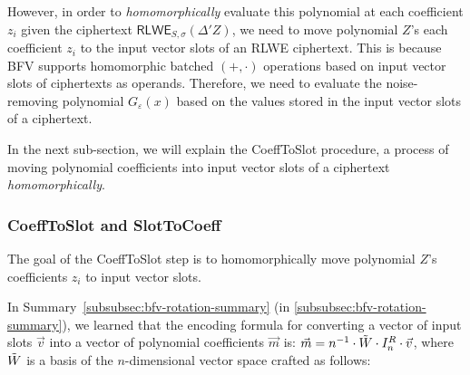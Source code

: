 




However, in order to \textit{homomorphically} evaluate this polynomial at each coefficient $z_i$ given the ciphertext $\textsf{RLWE}_{S, \sigma}(\Delta' Z)$, we need to move polynomial $Z$'s each coefficient $z_i$ to the input vector slots of an RLWE ciphertext. This is because BFV supports homomorphic batched $(+, \cdot)$ operations based on input vector slots of ciphertexts as operands. Therefore, we need to evaluate the noise-removing polynomial $G_\varepsilon(x)$ based on the values stored in the input vector slots of a ciphertext. 

In the next sub-section, we will explain the \textsf{CoeffToSlot} procedure, a process of moving polynomial coefficients into input vector slots of a ciphertext \textit{homomorphically}. 

\subsubsection{\textsf{CoeffToSlot} and \textsf{SlotToCoeff}}
\label{subsubsec:bfv-bootstrapping-coefftoslot}

The goal of the \textsf{CoeffToSlot} step is to homomorphically move polynomial $Z$'s coefficients $z_i$ to input vector slots. 


In Summary~\ref*{subsubsec:bfv-rotation-summary} (in \autoref{subsubsec:bfv-rotation-summary}), we learned that the encoding formula for converting a vector of input slots $\vec{v}$ into a vector of polynomial coefficients $\vec{m}$ is: $\vec{m} = n^{-1}\cdot\tilde{W} \cdot I_n^R \cdot \vec{v}$, where $\tilde{W}$ is a basis of the $n$-dimensional vector space crafted as follows: 

